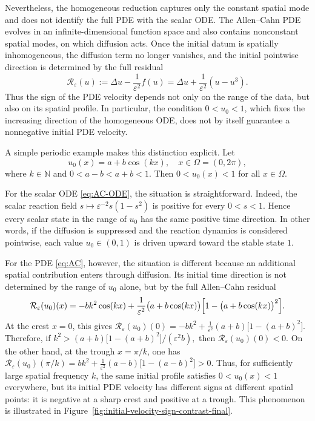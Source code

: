 \documentclass[final, 3p, times]{elsarticle}%
\newcommand{\eps}{\varepsilon}
\newcommand{\Reps}{\mathcal R_\varepsilon}
\begin{document}
Nevertheless, the homogeneous reduction captures only the constant spatial mode and does not identify the full PDE with the scalar ODE. The Allen--Cahn PDE evolves in an infinite-dimensional function space and also contains nonconstant spatial modes, on which diffusion acts. Once the initial datum is spatially inhomogeneous, the diffusion term no longer vanishes, and the initial pointwise direction is determined by the full residual
\[
    \Reps(u):=\Delta u-\frac1{\eps^2}f(u)=\Delta u+\frac1{\eps^2}(u-u^3).
\]
Thus the sign of the PDE velocity depends not only on the range of the data, but also on its spatial profile. In particular, the condition $0<u_0<1$, which fixes the increasing direction of the homogeneous ODE, does not by itself guarantee a nonnegative initial PDE velocity.

A simple periodic example makes this distinction explicit. Let
\[
u_0(x)=a+b\cos(kx), \quad x\in \Omega=(0,2\pi),
\]
where $k\in\mathbb N$ and $0<a-b<a+b<1$. Then
$0<u_0(x)<1$ for all $x\in\Omega$.

For the scalar ODE \eqref{eq:AC-ODE}, the situation is
straightforward. Indeed, the scalar reaction field
\(
s\mapsto \varepsilon^{-2}s(1-s^2)
\)
is positive for every \(0<s<1\). Hence every scalar state in the range
of \(u_0\) has the same positive time direction. In other words, if the
diffusion is suppressed and the reaction dynamics is considered
pointwise, each value \(u_0\in(0,1)\) is driven upward toward the
stable state \(1\).

For the PDE \eqref{eq:AC}, however, the situation is different because an additional spatial contribution
enters through diffusion. Its initial time direction is not determined by the range
of \(u_0\) alone, but by the full Allen--Cahn residual
\[
\mathcal R_\varepsilon(u_0)(x)=
-bk^2\cos(kx)
+\frac{1}{\varepsilon^2}
\bigl(a+b\cos(kx)\bigr)
\Bigl[1-\bigl(a+b\cos(kx)\bigr)^2\Bigr].
\]
At the crest \(x=0\), this gives
\(
\mathcal R_\varepsilon(u_0)(0)
=
-bk^2
+\frac{1}{\varepsilon^2}
(a+b)\bigl[1-(a+b)^2\bigr].
\)
Therefore, if
\(
k^2>
(a+b)\bigl[1-(a+b)^2\bigr]/
(\varepsilon^2 b),
\)
then
\(
\mathcal R_\varepsilon(u_0)(0)<0.
\)
On the other hand, at the trough \(x=\pi/k\), one has
\(
\mathcal R_\varepsilon(u_0)(\pi/k)
=
bk^2
+\frac{1}{\varepsilon^2}
(a-b)\bigl[1-(a-b)^2\bigr]
>0.
\)
Thus, for sufficiently large spatial frequency \(k\), the same initial
profile satisfies \(0<u_0(x)<1\) everywhere, but its initial PDE
velocity has different signs at different spatial points: it is
negative at a sharp crest and positive at a trough. This phenomenon is
illustrated in Figure~\ref{fig:initial-velocity-sign-contrast-final}.
\end{document}
